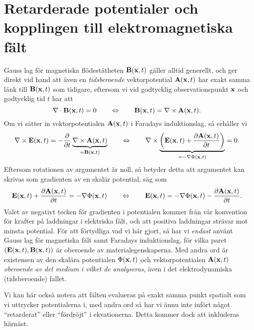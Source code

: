 \section{Retarderade potentialer och kopplingen till elektromagnetiska f{\"a}lt}
Gauss lag f{\"o}r magnetiska fl{\"o}dest{\"a}theten ${\bf B}({\bf x},t)$
g{\"a}ller alltid generellt, och ger direkt vid hand att {\"a}ven en {\it tidsberoende} vektorpotential ${\bf A}({\bf x},t)$ har exakt samma l{\"a}nk till ${\bf B}({\bf x},t)$ som tidigare, eftersom vi vid godtycklig observationspunkt ${\bf x}$ och godtycklig tid $t$ har att
$$
  \nabla\cdot{\bf B}({\bf x},t)=0
  \qquad\Leftrightarrow\qquad
  {\bf B}({\bf x},t)=\nabla\times{\bf A}({\bf x},t).
$$
Om vi s{\"a}tter in vektorpotentialen ${\bf A}({\bf x},t)$ i Faradays
induktionslag, s{\aa} erh{\aa}ller vi
$$
  \nabla\times{\bf E}({\bf x},t)=
    -{{\partial}\over{\partial t}}
       \underbrace{\nabla\times{\bf A}({\bf x},t)}_{={\bf B}({\bf x},t)}
  \qquad\Leftrightarrow\qquad
  \nabla\times\underbrace{
      \bigg({\bf E}({\bf x},t)
        +{{\partial{\bf A}({\bf x},t)}\over{\partial t}}
      \bigg)
    }_{=-\nabla\Phi({\bf x},t)}=0.
$$
Eftersom rotationen av argumentet {\"a}r noll,
s{\aa} betyder detta att argumentet kan skrivas som gradienten av en skal{\"a}r
potential, s{\"a}g som
$$
  {\bf E}({\bf x},t)
    +{{\partial{\bf A}({\bf x},t)}\over{\partial t}}
  =-\nabla\Phi({\bf x},t)
  \qquad\Leftrightarrow\qquad
  {\bf E}({\bf x},t)
    =-\nabla\Phi({\bf x},t)-{{\partial{\bf A}({\bf x},t)}\over{\partial t}}.
$$
Valet av negativt tecken f{\"o}r gradienten i potentialen kommer fr{\aa}n
v{\aa}r konvention f{\"o}r krafter p{\aa} laddningar i elektriska f{\"a}lt,
och att positiva laddningar str{\"a}var mot minsta potential.
F{\"o}r att f{\"o}rtydliga vad vi h{\"a}r gjort, s{\aa} har vi {\it endast}
anv{\"a}nt Gauss lag f{\"o}r magnetiska f{\"a}lt samt Faradays induktionslag,
f{\"o}r vilka paret $({\bf E}({\bf x},t),{\bf B}({\bf x},t))$ {\"a}r oberoende
av materialegenskaperna. Med andra ord {\"a}r existensen av den skal{\"a}ra
potentialen $\Phi({\bf x},t)$ och vektorpotentialen ${\bf A}({\bf x},t)$
{\it oberoende av det medium i vilket de analyseras}, {\"a}ven i det
elektrodynamiska (tidsberoende) fallet.

Vi kan h{\"a}r ocks{\aa} notera att f{\"a}lten evalueras p{\aa} exakt samma
punkt spatialt som vi uttrycker potentialerna i, med andra ord s{\aa} har vi
{\"a}nnu inte inf{\"o}rt n{\aa}got ``retarderat'' eller ``f{\"o}rdr{\"o}jt''
i ekvationerna. Detta kommer dock att inkluderas h{\"a}rn{\"a}st.

